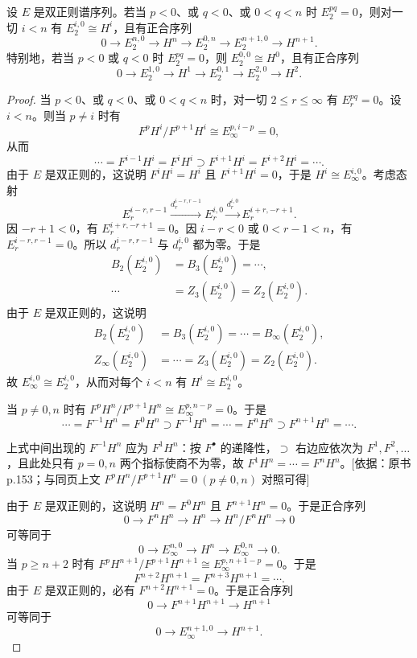 \begin{proposition}\label{it:2.2.3}
设 $E$ 是双正则谱序列。若当 $p<0$、或 $q<0$、或 $0<q<n$ 时 $E_2^{pq}=0$，则对一切 $i<n$ 有 $E_2^{i,0}\cong H^i$，且有正合序列
\[
0\to E_2^{n,0}\to H^n\to E_2^{0,n}\to E_2^{n+1,0}\to H^{n+1}.
\]
特别地，若当 $p<0$ 或 $q<0$ 时 $E_2^{pq}=0$，则 $E_2^{0,0}\cong H^0$，且有正合序列
\[
0\to E_2^{1,0}\to H^1\to E_2^{0,1}\to E_2^{2,0}\to H^2.
\]
\end{proposition}
\begin{proof}
当 $p<0$、或 $q<0$、或 $0<q<n$ 时，对一切 $2\le r\le\infty$ 有 $E_r^{pq}=0$。设 $i<n$。则当 $p\ne i$ 时有
\[
F^pH^i/F^{p+1}H^i\cong E_\infty^{p,i-p}=0,
\]
从而
\[
\cdots=F^{i-1}H^i=F^iH^i\supset F^{i+1}H^i=F^{i+2}H^i=\cdots.
\]
由于 $E$ 是双正则的，这说明 $F^iH^i=H^i$ 且 $F^{i+1}H^i=0$，于是 $H^i\cong E_\infty^{i,0}$。考虑态射
\[
E_r^{i-r,r-1}\xrightarrow{d_r^{i-r,r-1}}E_r^{i,0}\xrightarrow{d_r^{i,0}}E_r^{i+r,-r+1}.
\]
因 $-r+1<0$，有 $E_r^{i+r,-r+1}=0$。因 $i-r<0$ 或 $0<r-1<n$，有 $E_r^{i-r,r-1}=0$。所以 $d_r^{i-r,r-1}$ 与 $d_r^{i,0}$ 都为零。于是
\[
\begin{aligned}
B_2(E_2^{i,0})&=B_3(E_2^{i,0})=\cdots,\\
\cdots&=Z_3(E_2^{i,0})=Z_2(E_2^{i,0}).
\end{aligned}
\]
由于 $E$ 是双正则的，这说明
\[
\begin{aligned}
B_2(E_2^{i,0})&=B_3(E_2^{i,0})=\cdots=B_\infty(E_2^{i,0}),\\
Z_\infty(E_2^{i,0})&=\cdots=Z_3(E_2^{i,0})=Z_2(E_2^{i,0}).
\end{aligned}
\]
故 $E_\infty^{i,0}\cong E_2^{i,0}$，从而对每个 $i<n$ 有 $H^i\cong E_2^{i,0}$。

当 $p\ne 0,n$ 时有 $F^pH^n/F^{p+1}H^n\cong E_\infty^{p,n-p}=0$。于是
\[
\cdots=F^{-1}H^n=F^0H^n\supset F^{-1}H^n=\cdots=F^nH^n\supset F^{n+1}H^n=\cdots.
\]
\begin{tnote}
上式中间出现的 $F^{-1}H^n$ 应为 $F^1H^n$：按 $F^\bullet$ 的递降性，$\supset$ 右边应依次为 $F^1,F^2,\dots$，且此处只有 $p=0,n$ 两个指标使商不为零，故 $F^1H^n=\cdots=F^nH^n$。[依据：原书 p.153；与同页上文 $F^pH^n/F^{p+1}H^n=0\ (p\ne 0,n)$ 对照可得]
\end{tnote}
由于 $E$ 是双正则的，这说明 $H^n=F^0H^n$ 且 $F^{n+1}H^n=0$。于是正合序列
\[
0\to F^nH^n\to H^n\to H^n/F^nH^n\to 0
\]
可等同于
\begin{equation*}\tag{1}
0\to E_\infty^{n,0}\to H^n\to E_\infty^{0,n}\to 0.
\end{equation*}
当 $p\ge n+2$ 时有 $F^pH^{n+1}/F^{p+1}H^{n+1}\cong E_\infty^{p,n+1-p}=0$。于是
\[
F^{n+2}H^{n+1}=F^{n+3}H^{n+1}=\cdots.
\]
由于 $E$ 是双正则的，必有 $F^{n+2}H^{n+1}=0$。于是正合序列
\[
0\to F^{n+1}H^{n+1}\to H^{n+1}
\]
可等同于
\begin{equation*}\tag{2}
0\to E_\infty^{n+1,0}\to H^{n+1}.
\end{equation*}


\end{proof}
